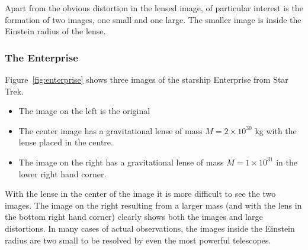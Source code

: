 \documentclass[aspectratio=1610,xcolor=dvipsnames,t]{beamer}
\begin{document}
Apart from the obvious distortion in the lensed image, of particular
interest is the formation of two images, one small and one large.
The smaller image is inside the Einstein radius of the lense.

\subsubsection{The Enterprise}
Figure~\ref{fig:enterprise} shows three images of the starship Enterprise
from Star Trek. 
\begin{itemize}
    \item The image on the left is the original
    \item The center image has a gravitational lense of mass
          $M = 2 \times 10^{30}$ kg with the lense placed in the 
          centre.
    \item The image on the right has a gravitational lense of
          mass $M = 1 \times 10^{31}$ in the lower right hand corner.
\end{itemize}

With the lense in the center of the image it is more difficult to 
see the two images. The image on the right resulting from a larger
mass (and with the lens in the bottom right hand corner)
clearly shows both the images and large distortions.
In many cases of actual observations, the images inside the Einstein radius
are two small to be resolved by even the most powerful telescopes.
\end{document}
